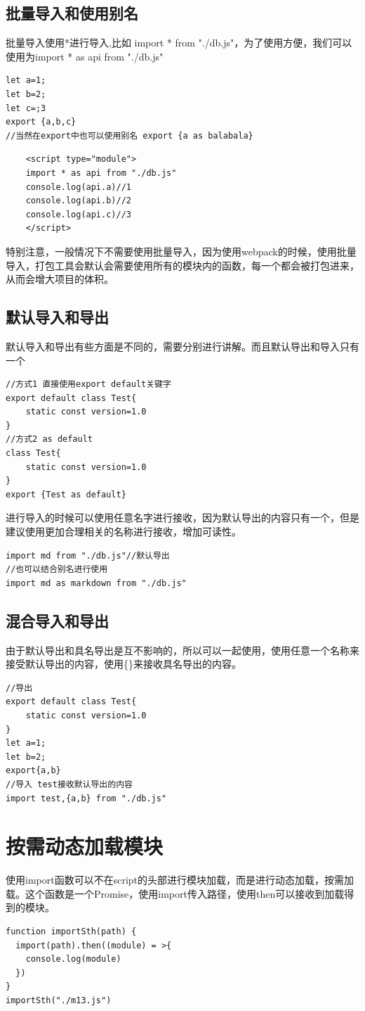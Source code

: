 \documentclass[
	11pt,
	fleqn,
	a4paper,
]{LegrandOrangeBook}
\begin{document}
\subsection{批量导入和使用别名}
批量导入使用*进行导入,比如 import * from "./db.js"，为了使用方便，我们可以使用为import * as api from "./db.js"
\begin{verbatim}
let a=1;
let b=2;
let c=;3
export {a,b,c}
//当然在export中也可以使用别名 export {a as balabala}
\end{verbatim}
\begin{verbatim}
    <script type="module">
    import * as api from "./db.js"
    console.log(api.a)//1
    console.log(api.b)//2
    console.log(api.c)//3
    </script>
\end{verbatim}
\begin{remark}
    特别注意，一般情况下不需要使用批量导入，因为使用webpack的时候，使用批量导入，打包工具会默认会需要使用所有的模块内的函数，每一个都会被打包进来，从而会增大项目的体积。
\end{remark}
\subsection{默认导入和导出}
默认导入和导出有些方面是不同的，需要分别进行讲解。而且默认导出和导入只有一个
\begin{verbatim}
//方式1 直接使用export default关键字
export default class Test{
    static const version=1.0
}
//方式2 as default
class Test{
    static const version=1.0
}
export {Test as default}
\end{verbatim}
进行导入的时候可以使用任意名字进行接收，因为默认导出的内容只有一个，但是建议使用更加合理相关的名称进行接收，增加可读性。
\begin{verbatim}
import md from "./db.js"//默认导出
//也可以结合别名进行使用
import md as markdown from "./db.js"
\end{verbatim}
\subsection{混合导入和导出}
由于默认导出和具名导出是互不影响的，所以可以一起使用，使用任意一个名称来接受默认导出的内容，使用\{\}来接收具名导出的内容。
\begin{verbatim}
//导出
export default class Test{
    static const version=1.0
}
let a=1;
let b=2;
export{a,b}
//导入 test接收默认导出的内容
import test,{a,b} from "./db.js"
\end{verbatim}

\section{按需动态加载模块}
使用import函数可以不在script的头部进行模块加载，而是进行动态加载，按需加载。这个函数是一个Promise，使用import传入路径，使用then可以接收到加载得到的模块。
\begin{verbatim}
function importSth(path) {
  import(path).then((module) = >{
    console.log(module)
  })
}
importSth("./m13.js")
\end{verbatim}
\end{document}
